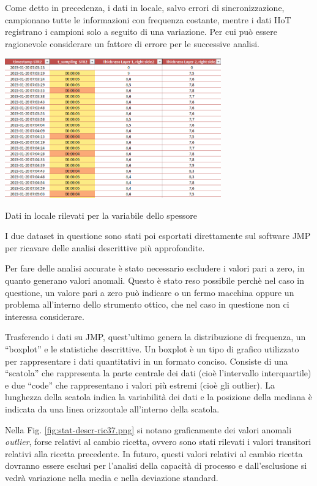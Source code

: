 Come detto in precedenza, i dati in locale, salvo errori di sincronizzazione, campionano tutte le informazioni con frequenza costante, mentre i dati IIoT registrano i campioni solo a seguito di una variazione.
Per cui può essere ragionevole considerare un fattore di errore per le successive analisi.

\begin{table}[h]
  \centering
  \includegraphics[width=0.7\textwidth]{img/table-str2-ric37.png}
  \caption{Dati in locale rilevati per la variabile dello spessore}
  \label{fig:table-str2-ric37.png}
\end{table}

I due dataset in questione sono stati poi esportati direttamente sul software JMP per ricavare delle analisi descrittive più approfondite.

Per fare delle analisi accurate è stato necessario escludere i valori pari a zero, in quanto generano valori anomali. Questo è stato reso possibile perchè nel caso in questione, un valore pari a zero può indicare o un fermo macchina oppure un problema all'interno dello strumento ottico, che nel caso in questione non ci interessa considerare.


Trasferendo i dati su JMP, quest'ultimo genera la distribuzione di frequenza, un ``boxplot'' e le statistiche descrittive.
Un boxplot è un tipo di grafico utilizzato per rappresentare i dati quantitativi in un formato conciso. Consiste di una ``scatola'' che rappresenta la parte centrale dei dati (cioè l'intervallo interquartile) e due ``code'' che rappresentano i valori più estremi (cioè gli outlier). 
La lunghezza della scatola indica la variabilità dei dati e la posizione della mediana è indicata da una linea orizzontale all'interno della scatola. 
\cite{JMPBoxplot}



Nella Fig. \ref{fig:stat-descr-ric37.png} si notano graficamente dei valori anomali \textit{outlier}, forse relativi al cambio ricetta, ovvero sono stati rilevati i valori transitori relativi alla ricetta precedente.
In futuro, questi valori relativi al cambio ricetta dovranno essere esclusi per l'analisi della capacità di processo e dall'esclusione si vedrà variazione nella media e nella deviazione standard.


